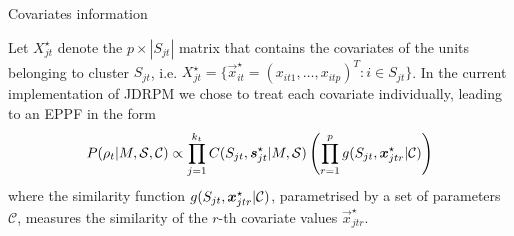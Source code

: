 \documentclass[
	11pt, %
 xcolor={dvipsnames,svgnames}
]{beamer}
\begin{document}
\begin{frame}{Covariates information}
    
Let $X_{jt}^\star$ denote the $p \times |S_{jt}|$ matrix that contains the covariates of the units belonging to cluster $S_{jt}$, i.e. $X_{jt}^\star = \{ \vec{x}_{it}^\star = (x_{it1}, \ldots, x_{itp})^T : i \in S_{jt} \}$. In the current implementation of JDRPM we chose to treat each covariate individually, leading to an EPPF in the form 
\begin{equation*}
P(\rho_t|M,\mathcal{S},\mathcal{C}) \propto \prod_{j=1}^{k_t} C(S_{jt},\boldsymbol{s}_{jt}^\star|M,\mathcal{S}) \left( \prod_{r=1}^p g(S_{jt},\boldsymbol{x}_{jtr}^\star|\mathcal{C}) \right)
    \label{eppf covariates informed}
\end{equation*}
where the \alert{similarity function} $g(S_{jt},\boldsymbol{x}_{jtr}^\star|\mathcal{C})$, parametrised by a set of parameters $\mathcal{C}$, measures the similarity of the $r$-th covariate values $\vec{x}_{jtr}^\star$.
\end{frame}


\end{document}
